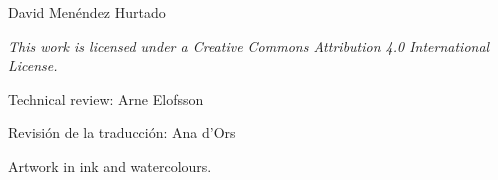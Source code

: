 
\phantom{x}

\vfill
David Menéndez Hurtado

\emph{\footnotesize This work is licensed under a Creative Commons Attribution 4.0 International License.}
\ccby


\phantom{x}

Technical review: Arne Elofsson

Revisión de la traducción: Ana d'Ors

\phantom{x}

Artwork in ink and watercolours.



\restoregeometry
\newpage